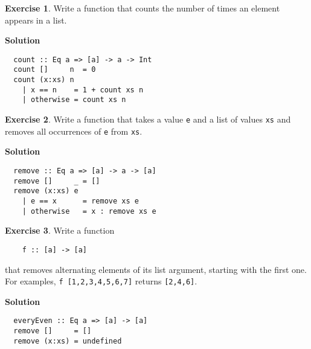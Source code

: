 \documentclass[11pt,a4paper]{article}
\theoremstyle{definition}
\newtheorem{exr}{Exercise}
\begin{document}
\newpage

\begin{exr}
  Write a function that counts the number of times an element appears in a list.
\end{exr}

\textbf{Solution}
\begin{lstlisting}
  count :: Eq a => [a] -> a -> Int
  count []     n  = 0
  count (x:xs) n
    | x == n    = 1 + count xs n
    | otherwise = count xs n
\end{lstlisting}


\vspace{5mm}

\begin{exr}
  Write a function that takes a value \texttt{e} and a list of values \texttt{xs}
  and removes all occurrences of \texttt{e} from \texttt{xs}.
\end{exr}

\textbf{Solution}
\begin{lstlisting}
  remove :: Eq a => [a] -> a -> [a]
  remove []     _ = []
  remove (x:xs) e
    | e == x      = remove xs e
    | otherwise   = x : remove xs e
\end{lstlisting}


\vspace{5mm}

\begin{exr}
  Write a function 
  
  \begin{lstlisting}
    f :: [a] -> [a]
  \end{lstlisting}

  that removes alternating elements of its list argument, starting with 
  the first one. For examples, \texttt{f [1,2,3,4,5,6,7]} returns 
  \texttt{[2,4,6]}.
\end{exr}

\textbf{Solution}
\begin{lstlisting}
  everyEven :: Eq a => [a] -> [a]
  remove []     = []
  remove (x:xs) = undefined
\end{lstlisting}
\end{document}

